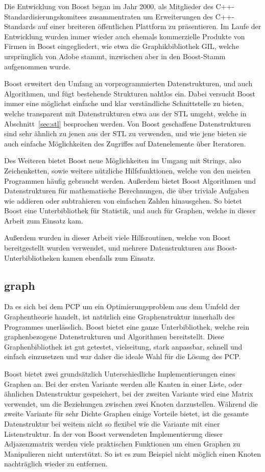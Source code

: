 Die Entwicklung von Boost began im Jahr 2000, als Mitglieder des C++\--Standardisierungs\-komitees zusammentraten um Erweiterungen des C++-Standards auf einer breiteren öffentlichen Plattform zu präsentieren.
Im Laufe der Entwicklung wurden immer wieder auch ehemals kommerzielle Produkte von Firmen in Boost eingegliedert, wie etwa die Graphikbibliothek GIL, welche ursprünglich von Adobe stammt, inzwischen
aber in den Boost-Stamm aufgenommen wurde.

Boost erweitert den Umfang an vorprogrammierten Datenstrukturen, und auch Algorithmen, und fügt bestehende Strukturen nahtlos ein. Dabei versucht Boost immer eine möglichst einfache und klar verständliche
Schnittstelle zu bieten, welche transparent mit Datenstrukturen etwa aus der STL umgeht, welche in Abschnitt~\ref{sec:stl} besprochen werden. Von Boost geschaffene Datenstrukturen sind sehr ähnlich zu jenen
aus der STL zu verwenden, und wie jene bieten sie auch einfache Möglichkeiten des Zugriffes auf Datenelemente über Iteratoren. 

Des Weiteren bietet Boost neue Möglichkeiten im Umgang mit Strings, also Zeichenketten, sowie weitere nützliche Hilfsfunktionen, welche von den meisten Programmen häufig gebraucht werden. Außerdem bietet
Boost Algorithmen und Datenstrukturen für mathematische Berechnungen, die über triviale Aufgaben wie addieren oder subtrahieren von einfachen Zahlen hinausgehen. So bietet Boost eine Unterbibliothek für 
Statistik, und auch für Graphen, welche in dieser Arbeit zum Einsatz kam.

Außerdem wurden in dieser Arbeit viele Hilfsroutinen, welche von Boost bereitgestellt wurden verwendet, und mehrere Datenstrukturen aus Boost-Unterbibliotheken kamen ebenfalls zum Einsatz.

\subsection{graph}
\label{sec:boost:graph}
Da es sich bei dem PCP um ein Optimierungsproblem aus dem Umfeld der Graphentheorie handelt, ist natürlich eine Graphenstruktur innerhalb des Programmes unerlässlich. Boost bietet eine ganze Unterbibliothek, 
welche rein graphenbezogene Datenstrukturen und Algorithmen bereitstellt. Diese Graphenbibliothek ist gut getestet, vielseitung, stark anpassbar, schnell und einfach einzusetzen und war daher die ideale Wahl
für die Lösung des PCP\@.

Boost bietet zwei grundsätzlich Unterschiedliche Implementierungen eines Graphen an. Bei der ersten Variante werden alle Kanten in einer Liste, oder ähnlichen Datenstruktur gespeichert, bei
der zweiten Variante wird eine Matrix verwendet, um die Beziehungen zwischen zwei Knoten darzustellen. Während die zweite Variante für sehr Dichte Graphen einige Vorteile bietet, ist die gesamte
Datenstruktur bei weitem nicht so flexibel wie die Variante mit einer Listenstruktur. In der von Boost verwendeten Implementierung dieser Adjazenzmatrix werden viele praktischen Funktionen um einen
Graphen zu Manipulieren nicht unterstützt. So ist es zum Beispiel nicht möglich einen Knoten nachträglich wieder zu entfernen. 

